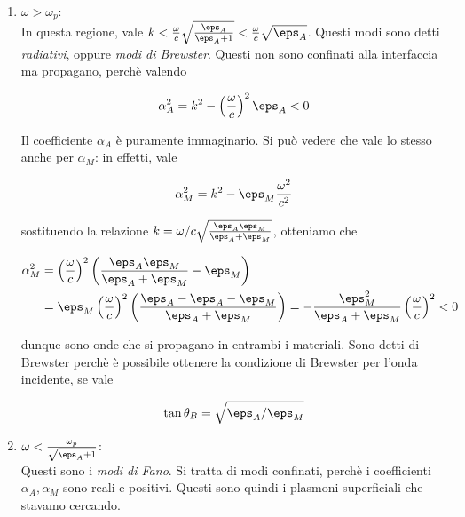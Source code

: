 \documentclass{report}
\begin{document}
\begin{enumerate}
    \item \(\omega > \omega_p\): \\
    In questa regione, vale \(k < \frac{\omega}{c}\sqrt{\frac{\eps_A}{\eps_A +1}} < \frac{\omega}{c}\sqrt{\eps_A}\). Questi modi sono detti \emph{radiativi}, oppure \emph{modi di Brewster}. Questi non sono confinati alla interfaccia ma propagano, perchè valendo 
    
    \begin{align}
        \alpha_A^2 = k^2 - \left(\frac{\omega}{c} \right)^2\eps_A < 0
    \end{align}

    Il coefficiente \(\alpha_A\) è puramente immaginario. Si può vedere che vale lo stesso anche per \(\alpha_M\): in effetti, vale 

    \begin{align}
        \alpha^2_M = k^2  - \eps_M \frac{\omega^2}{c^2} 
    \end{align}

    sostituendo la relazione \(k = \omega/c \sqrt{\frac{\eps_A\eps_M}{\eps_A + \eps_M}}\), otteniamo che 

    \begin{align}
        \alpha_M^2 &= \left(\frac{\omega}{c} \right)^2\left(\frac{\eps_A\eps_M}{\eps_A + \eps_M} -\eps_M\right) \\
        &= \eps_M \left( \frac{\omega}{c}\right)^2 \left(\frac{\eps_A - \eps_A - \eps_M}{\eps_A + \eps_M} \right) = -\frac{\eps_M^2 }{\eps_A + \eps_M}\left(\frac{\omega}{c} \right)^2 < 0
    \end{align}

    dunque sono onde che si propagano in entrambi i materiali. Sono detti di Brewster perchè è possibile ottenere la condizione di Brewster per l'onda incidente, se vale 

    \begin{align}
        \tan\theta_B = \sqrt{\eps_A/\eps_M}
    \end{align}

    \item \(\omega < \frac{\omega_p}{\sqrt{\eps_A + 1}}\): \\
    Questi sono i \emph{modi di Fano}. Si tratta di modi confinati, perchè i coefficienti \(\alpha_A, \alpha_M\) sono reali e positivi. Questi sono quindi i plasmoni superficiali che stavamo cercando. 

\end{enumerate}
\end{document}
